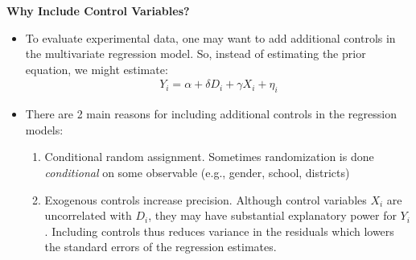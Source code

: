 \documentclass[notes=show]{beamer}
\begin{document}
\begin{frame}[plain]
	\begin{center}
	\textbf{Why Include Control Variables?}
	\end{center}
	
	\begin{itemize}
	\item To evaluate experimental data, one may want to add additional controls in the multivariate regression model.  So, instead of estimating the prior equation, we might estimate:
		\begin{eqnarray*}
		Y_i = \alpha + \delta D_i + \gamma X_i + \eta_i
		\end{eqnarray*}
	\item There are 2 main reasons for including additional controls in the regression models:
		\begin{enumerate}
		\item Conditional random assignment.  Sometimes randomization is done \emph{conditional} on some observable (e.g., gender, school, districts)
		\item Exogenous controls increase precision.  Although control variables $X_i$ are uncorrelated with $D_i$, they may have substantial explanatory power for $Y_i$. Including controls thus reduces variance in the residuals which lowers the standard errors of the regression estimates.
		\end{enumerate}
	\end{itemize}
\end{frame}
\end{document}
